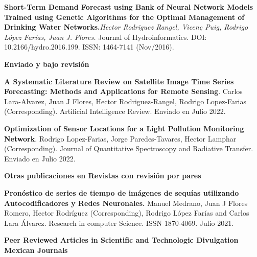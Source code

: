 \documentclass[10pt]{article}
\newenvironment{innerlist}[1][\enskip\textbullet]%
        {\begin{compactitem}[#1]}{\end{compactitem}}
\newcommand{\blankline}{\quad\pagebreak[2]}
\begin{document}
\begin{innerlist}
\item \textbf{Short-Term Demand Forecast using Bank of Neural Network Models Trained using Genetic Algorithms for the Optimal Management of Drinking Water Networks.}\textit{Hector Rodriguez Rangel, Vicen\c{c} Puig, Rodrigo López Farías, Juan J. Flores.}  {Journal of Hydroinformatics}. DOI: 10.2166/hydro.2016.199. ISSN: 1464-7141 (Nov/2016).

\blankline




\textbf{Enviado y bajo revisión}
\begin{innerlist}
\item \textbf{A Systematic Literature Review on Satellite Image Time Series Forecasting: Methods and Applications for Remote Sensing}. Carlos Lara-Alvarez, Juan J Flores, 
Hector Rodriguez-Rangel, Rodrigo Lopez-Farias (Corresponding). Artificial Intelligence Review. Enviado en Julio 2022.
\item  \textbf{Optimization of Sensor Locations for a Light Pollution Monitoring Network}.  Rodrigo Lopez-Farias, Jorge Paredes-Tavares, Hector Lamphar   (Corresponding).  Journal of Quantitative Spectroscopy and Radiative Transfer. Enviado en Julio 2022.
\end{innerlist}

\blankline


\textbf{Otras publicaciones en Revistas con revisión por pares}

\begin{innerlist}
\item \textbf{Pronóstico de series de tiempo de imágenes de sequías utilizando Autocodificadores y Redes Neuronales.} Manuel Medrano, Juan J Flores Romero, Hector Rodríguez (Corresponding), Rodrigo López Farías and Carlos Lara Álvarez. Research in computer Science. ISSN 1870-4069. Julio 2021.
\end{innerlist}

\blankline



\textbf{Peer Reviewed Articles in Scientific and Technologic Divulgation Mexican Journals }



\end{innerlist}
\end{document}
